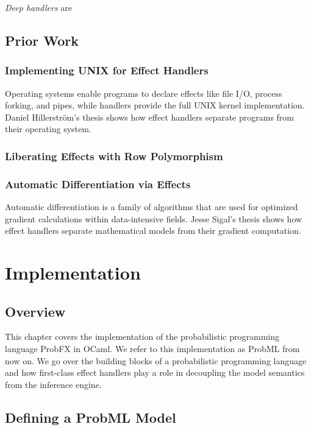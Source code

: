 \documentclass[logo,bsc,singlespacing,parskip,online]{infthesis}
\begin{document}
\textit{Deep handlers} are 

\section{Prior Work}


\subsection{Implementing UNIX for Effect Handlers}

Operating systems enable programs to declare effects like file I/O, process forking, and pipes, while handlers provide the full UNIX kernel implementation. Daniel Hillerström's thesis \citep{UNIXDHil} shows how effect handlers separate programs from their operating system.

\subsection{Liberating Effects with Row Polymorphism}

\subsection{Automatic Differentiation via Effects}

Automatic differentiation is a family of algorithms that are used for optimized gradient calculations within data-intensive fields. Jesse Sigal's thesis \citep{AdBySigal} shows how effect handlers separate mathematical models from their gradient computation.





\chapter{Implementation}

\section{Overview}

This chapter covers the implementation of the probabilistic programming language ProbFX \citep{ProbFX} in OCaml. We refer to this implementation as ProbML from now on. We go over the building blocks of a probabilistic programming language and how first-class effect handlers play a role in decoupling the model semantics from the inference engine. 

\section{Defining a ProbML Model}
\end{document}
